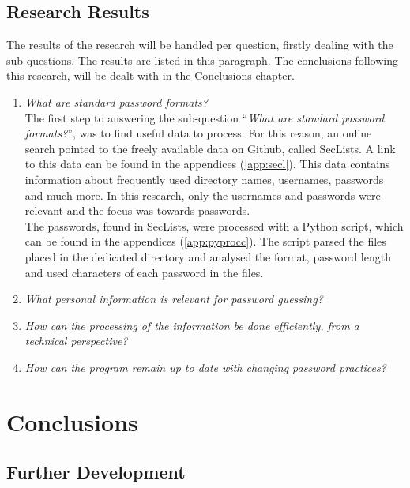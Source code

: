 \documentclass[a4paper,12pt]{article}
\begin{document}
\subsection{Research Results}

The results of the research will be handled per question, firstly dealing with the sub-questions.
The results are listed in this paragraph. The conclusions following this research, will be dealt with in the Conclusions chapter.

\begin{enumerate}
\item \textit{What are standard password formats?}\\
  The first step to answering the sub-question ``\textit{What are standard password formats?}'', was to find useful data to process. For this reason, an online search pointed to the freely available data on Github, called SecLists. A link to this data can be found in the appendices (\ref{app:secl}). This data contains information about frequently used directory names, usernames, passwords and much more. In this research, only the usernames and passwords were relevant and the focus was towards passwords.\\

  The passwords, found in SecLists, were processed with a Python script, which can be found in the appendices (\ref{app:pyprocc}). The script parsed the files placed in the dedicated directory and analysed the format, password length and used characters of each password in the files. 
  
\item \textit{What personal information is relevant for password guessing?}\\
  
\item \textit{How can the processing of the information be done efficiently, from a technical perspective?}\\
  
\item \textit{How can the program remain up to date with changing password practices?}\\
  
\end{enumerate}

\section{Conclusions}

\subsection{Further Development}
\end{document}
